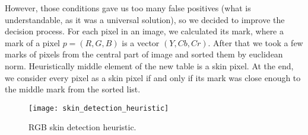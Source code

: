        However, those conditions gave us too many false positives
        (what is understandable, as it was a universal solution),
        so we decided to improve the decision process.
        For each pixel in an image, we calculated its mark, where a mark of a pixel
        $p = (R, G, B)$ is a vector $(Y, Cb, Cr)$.
        After that we took a few marks of pixels from the central part of image and
        sorted them by euclidean norm.
        Heuristically middle element of the new table is a skin pixel.
        At the end, we consider every pixel as a skin pixel if and only if
        its mark was close enough to the middle mark from the sorted list.

        \begin{figure}[H]
            \caption{RGB skin detection heuristic.}
            \centering
            \texttt{[image: skin\_detection\_heuristic]}
            \label{fig:skin_detection_heuristic}
        \end{figure}
